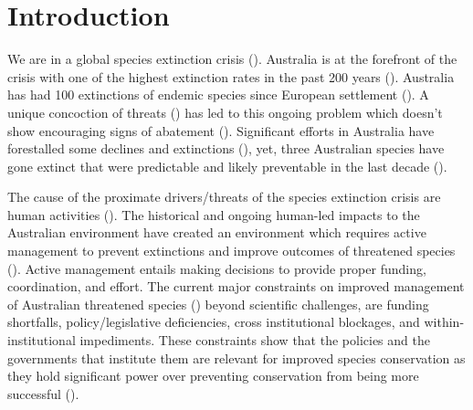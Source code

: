 \documentclass[a4paper,11pt]{article}
\begin{document}
\newpage
\section{Introduction}

We are in a global species extinction crisis (\cite{ceballosAcceleratedModernHuman2015,lewisDefiningAnthropocene2015,ipbesSummaryPolicymakersGlobal2019}). Australia is at the forefront of the crisis with one of the highest extinction rates in the past 200 years (\cite{woinarskiOngoingUnravelingContinental2015}). Australia has had 100 extinctions of endemic species since European settlement (\cite{rewoinarskiReadingBlackBook2019, commonwealthofaustraliaSpeciesProfileThreats2021}). A unique concoction of threats (\cite{kearneyThreatsAustraliaImperilled2019}) has led to this ongoing problem which doesn't show encouraging signs of abatement (\cite{simmondsVulnerableSpeciesEcosystems2020,wardLotsLossLittle2019,resideHowSendFinch2019}). Significant efforts in Australia have forestalled some declines and extinctions (\cite{kearneyThreatsAustraliaImperilled2019}), yet, three Australian species have gone extinct that were predictable and likely preventable in the last decade (\cite{woinarskiContributionPolicyLaw2017}).

The cause of the proximate drivers/threats of the species extinction crisis are human activities (\cite{sternerPolicyDesignAnthropocene2019, maxwellBiodiversityRavagesGuns2016,brookSynergiesExtinctionDrivers2008}). The historical and ongoing human-led impacts to the Australian environment have created an environment which requires active management to prevent extinctions and improve outcomes of threatened species (\cite{kearneyThreatsAustraliaImperilled2019, allekThreatsEndangeringAustralia2018}). Active management entails making decisions to provide proper funding, coordination, and effort. The current major constraints on improved management of Australian threatened species (\cite{leggeMonitoringThreatenedSpecies2018, wintleSpendingWhatWill2019, simmondsVulnerableSpeciesEcosystems2020,kearneyThreatsAustraliaImperilled2019,woinarskiReadingBlackBook2019,wardLotsLossLittle2019}) beyond scientific challenges, are funding shortfalls, policy/legislative deficiencies, cross institutional blockages, and within-institutional impediments. These constraints show that the policies and the governments that institute them are relevant for improved species conservation as they hold significant power over preventing conservation from being more successful (\cite{rydenLinkingDemocracyBiodiversity2020}).
\end{document}
